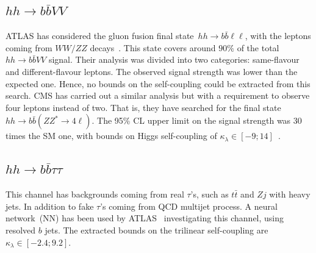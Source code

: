 \subsection*{$hh \to b\bar b VV $}
ATLAS has considered the gluon fusion final state~$hh \to b\bar b \ell \ell$, with the leptons coming from $WW/ZZ$ decays~\cite{ATLAS:2019vwv}. This state covers around $90\%$ of the total~$hh \to b\bar b VV $ signal. Their analysis was divided into two categories: same-flavour and different-flavour leptons. The observed signal strength was lower than the expected one. Hence, no bounds on the self-coupling could be extracted from this search. CMS has carried out a similar analysis but with a requirement to observe four leptons instead of two. That is, they have searched for the final state $hh \to b\bar b( ZZ^*\to 4\ell)$. The 95\% CL upper limit on the signal strength was 30 times the SM one, with bounds on Higgs self-coupling of $\kappa_\lambda \in [-9;14]$~\cite{CMS-PAS-HIG-20-004}. 
\subsection*{$hh \to b\bar b \tau \tau $}
This channel has backgrounds coming from real $\tau$'s, such as $t\bar t$ and $Z j$ with heavy jets. In addition to fake $\tau$'s coming from QCD multijet process. A neural network~(NN) has been used by ATLAS~\cite{ATLAS-CONF-2021-052} investigating this channel, using resolved $b$ jets. The extracted bounds on the trilinear self-coupling are $\kappa_\lambda \in [-2.4;9.2]$. 
